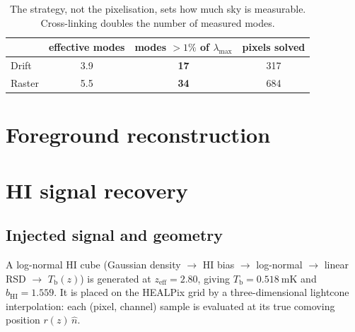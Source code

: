 \documentclass[a4paper,fleqn,usenatbib]{mnras}
\newcommand{\Tb}{T_{\mathrm{b}}}
\begin{document}
\begin{table}[h]
\centering
\begin{tabular}{lccc}
\toprule
 & effective modes & modes $> 1\%$ of $\lambda_{\max}$ & pixels solved \\
\midrule
Drift  & 3.9 & \textbf{17} & 317 \\
Raster & 5.5 & \textbf{34} & 684 \\
\bottomrule
\end{tabular}
\caption{The strategy, not the pixelisation, sets how much sky is measurable.
Cross-linking doubles the number of measured modes.}
\label{tab:modes}
\end{table}


\section{Foreground reconstruction}
\label{sec:foreground}


\section{HI signal recovery}
\label{sec:hi}

\subsection{Injected signal and geometry}
A log-normal HI cube (Gaussian density $\rightarrow$ HI bias $\rightarrow$
log-normal $\rightarrow$ linear RSD $\rightarrow$ $\Tb(z)$) is generated at
$z_{\mathrm{eff}} = 2.80$, giving $\Tb = \SI{0.518}{\milli\kelvin}$ and
$b_{\mathrm{HI}} = 1.559$. It is placed on the HEALPix grid by a
three-dimensional lightcone interpolation: each (pixel, channel) sample is
evaluated at its true comoving position $r(z)\,\hat{n}$.
\end{document}
